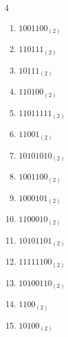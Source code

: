\begin{multicols}{4}
\begin{enumerate}
        \phantom{$=147$}

  \item $1001100_{(2)}$

        \phantom{$=76$}

\columnbreak %

  \item $110111_{(2)}$

        \phantom{$=55$}

  \item $10111_{(2)}$

        \phantom{$=23$}

  \item $110100_{(2)}$

        \phantom{$=52$}

  \item $11011111_{(2)}$

        \phantom{$=223$}

  \item $11001_{(2)}$

        \phantom{$=25$}

  \item $10101010_{(2)}$

        \phantom{$=170$}

  \item $1001100_{(2)}$

        \phantom{$=76$}

  \item $1000101_{(2)}$

        \phantom{$=69$}

  \item $1100010_{(2)}$

        \phantom{$=98$}

  \item $10101101_{(2)}$

        \phantom{$=173$}

  \item $11111100_{(2)}$

        \phantom{$=252$}

  \item $10100110_{(2)}$

        \phantom{$=166$}

  \item $1100_{(2)}$

        \phantom{$=12$}

  \item $10100_{(2)}$


\end{enumerate}
\end{multicols}
